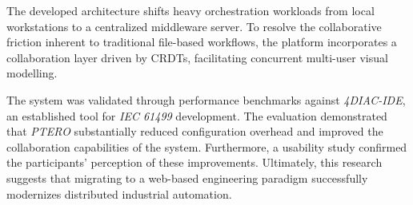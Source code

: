 The developed architecture shifts heavy orchestration workloads from local workstations to a centralized middleware server. To resolve the collaborative friction inherent to traditional file-based workflows, the platform incorporates a collaboration layer driven by \acp{CRDT}, facilitating concurrent multi-user visual modelling.

The system was validated through performance benchmarks against \textit{4DIAC-IDE}, an established tool for \textit{IEC 61499} development. The evaluation demonstrated that \textit{PTERO} substantially reduced configuration overhead and improved the collaboration capabilities of the system. Furthermore, a usability study confirmed the participants' perception of these improvements. Ultimately, this research suggests that migrating to a web-based engineering paradigm successfully modernizes distributed industrial automation.

\acresetall %
